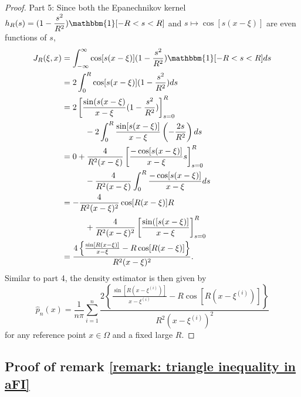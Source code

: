 \documentclass[%
 reprint,
 amsmath,amssymb,
 aps,
]{revtex4-2}
\begin{document}
\begin{proof}
    Part 5: Since both the Epanechnikov kernel $\displaystyle h_R(s) = (1 - \frac{s^2}{R^2}) \mathbbm{1}[-R < s < R]$ and $s \mapsto \cos[s(x - \xi)]$ are even functions of $s$,
    \begin{align*}
        J_R(\xi, x) & = \int_{-\infty}^\infty \cos[s(x - \xi)](1 - \frac{s^2}{R^2}) \mathbbm{1}[-R < s < R]ds \\
        & = 2 \int_0^R \cos[s(x - \xi)](1 - \frac{s^2}{R^2}) ds \\
        & = 2\left[\frac{\sin(s(x - \xi)}{x - \xi}(1 - \frac{s^2}{R^2}) \right]^R_{s = 0} \\
        & \hspace{1cm} -2\int_0^R \frac{\sin[s(x - \xi)]}{x - \xi}\left(-\frac{2s}{R^2} \right) ds \\
        & = 0 + \frac{4}{R^2(x - \xi)} \left[\frac{-\cos[s(x - \xi)]}{x - \xi}s \right]^R_{s = 0} \\
        & \hspace{1cm} - \frac{4}{R^2(x - \xi)} \int_0^R \frac{-\cos[s(x - \xi)]}{x - \xi} ds \\
        & = -\frac{4}{R^2(x - \xi)^2}\cos[R(x - \xi)]R \\
        & \hspace{1cm} + \frac{4}{R^2(x - \xi)^2}\left[\frac{\sin([s(x - \xi)]}{x - \xi} \right]^R_{s = 0} \\
        & = \frac{4\left\{\frac{\sin[R(x - \xi)]}{x - \xi} - R\cos[R(x - \xi)] \right\}}{R^2(x - \xi)^2}.
    \end{align*}
    Similar to part 4, the density estimator is then given by
    \begin{equation*}
        \hat{p}_n(x) = \frac{1}{n\pi} \sum_{i = 1}^n \frac{2\left\{\frac{\sin[R(x - \xi^{(i)})]}{x - \xi^{(i)}} - R\cos[R(x - \xi^{(i)})] \right\}}{R^2(x - \xi^{(i)})^2}
    \end{equation*}
    for any reference point $x \in \Omega$ and a fixed large $R$.
\end{proof}

\subsection{Proof of remark \ref{remark: triangle inequality in aFI}}
\end{document}
